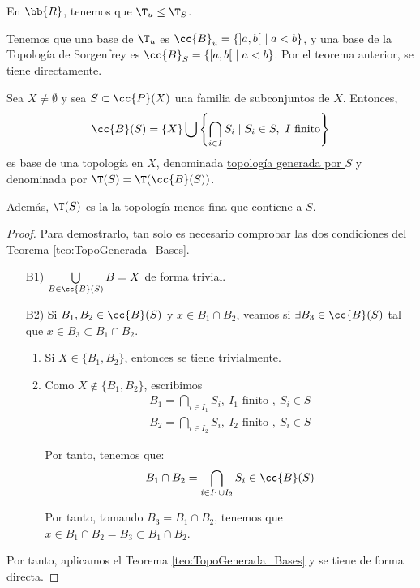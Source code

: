 \begin{ejemplo}
    En $\bb{R}$, tenemos que $\T_u\leq \T_S$.

    Tenemos que una base de $\T_u$ es $\cc{B}_u=\{]a,b[~\mid a<b\}$, y una base de la Topología de Sorgenfrey es $\cc{B}_S=\{[a,b[~\mid a<b\}$. Por el teorema anterior, se tiene directamente.
\end{ejemplo}

\begin{prop}\label{teo:TopoGenerada_Conjunto}
    Sea $X\neq \emptyset$ y sea $S\subset \cc{P}(X)$ una familia de subconjuntos de $X$. Entonces,
    \begin{equation*}
        \cc{B}(S)=\{X\}\bigcup \left\{\bigcap_{i\in I}S_i \mid S_i\in S,~I\text{ finito}\right\}
    \end{equation*}
    es base de una topología en $X$, denominada \ul{topología generada por $S$} y denominada por $\T(S)=\T(\cc{B}(S))$.

    Además, $\T(S)$ es la la topología menos fina que contiene a $S$.
\end{prop}
\begin{proof}
    Para demostrarlo, tan solo es necesario comprobar las dos condiciones del Teorema \ref{teo:TopoGenerada_Bases}.
    \begin{enumerate}
        \item[B1)] $\bigcup\limits_{B\in \cc{B}(S)} B=X$ de forma trivial.
        \item[B2)] Si $B_1, B_2\in \cc{B}(S)$ y $x\in B_1\cap B_2$, veamos si $\exists B_3\in \cc{B}(S)$ tal que $x\in B_3\subset B_1\cap B_2$.
        \begin{enumerate}
            \item Si $X\in \{B_1,B_2\}$, entonces se tiene trivialmente.
            \item Como $X\notin \{B_1,B_2\}$, escribimos
            \begin{gather*}
                B_1=\bigcap\limits_{i\in I_1}S_i,~I_1 \text{ finito },~S_i\in S\\
                B_2=\bigcap\limits_{i\in I_2}S_i,~I_2 \text{ finito },~S_i\in S
            \end{gather*}

            Por tanto, tenemos que:
            $$B_1\cap B_2 = \bigcap_{i\in I_1\cup I_2}S_i\in \cc{B}(S)$$

            Por tanto, tomando $B_3=B_1\cap B_2$, tenemos que $x\in B_1\cap B_2=B_3\subset B_1\cap B_2$.
        \end{enumerate}
    \end{enumerate}

    Por tanto, aplicamos el Teorema \ref{teo:TopoGenerada_Bases} y se tiene de forma directa.
\end{proof}

